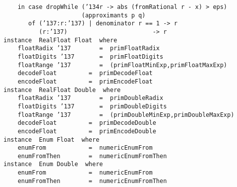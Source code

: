 \mbox{\tt \ \ \ \ in\ case\ dropWhile\ ({\char'134}r\ ->\ abs\ (fromRational\ r\ -\ x)\ >\ eps)}\\
\mbox{\tt \ \ \ \ \ \ \ \ \ \ \ \ \ \ \ \ \ \ \ \ \ \ (approximants\ p\ q)}\\
\mbox{\tt \ \ \ \ \ \ \ of\ ({\char'137}:r:{\char'137})\ |\ denominator\ r\ ==\ 1\ ->\ r}\\
\mbox{\tt \ \ \ \ \ \ \ \ \ \ (r:{\char'137})\ \ \ \ \ \ \ \ \ \ \ \ \ \ \ \ \ \ \ \ \ \ \ \ ->\ r}
\eprogB\noindent\bprogB
\mbox{\tt instance\ \ RealFloat\ Float\ \ where}\\
\mbox{\tt \ \ \ \ floatRadix\ {\char'137}\ \ \ \ \ \ \ \ =\ \ primFloatRadix}\\
\mbox{\tt \ \ \ \ floatDigits\ {\char'137}\ \ \ \ \ \ \ =\ \ primFloatDigits}\\
\mbox{\tt \ \ \ \ floatRange\ {\char'137}\ \ \ \ \ \ \ \ =\ \ (primFloatMinExp,primFloatMaxExp)}\\
\mbox{\tt \ \ \ \ decodeFloat\ \ \ \ \ \ \ \ \ =\ \ primDecodeFloat}\\
\mbox{\tt \ \ \ \ encodeFloat\ \ \ \ \ \ \ \ \ =\ \ primEncodeFloat}
%
\eprogB\noindent\bprogB
\mbox{\tt instance\ \ RealFloat\ Double\ \ where}\\
\mbox{\tt \ \ \ \ floatRadix\ {\char'137}\ \ \ \ \ \ \ \ =\ \ primDoubleRadix}\\
\mbox{\tt \ \ \ \ floatDigits\ {\char'137}\ \ \ \ \ \ \ =\ \ primDoubleDigits}\\
\mbox{\tt \ \ \ \ floatRange\ {\char'137}\ \ \ \ \ \ \ \ =\ \ (primDoubleMinExp,primDoubleMaxExp)}\\
\mbox{\tt \ \ \ \ decodeFloat\ \ \ \ \ \ \ \ \ =\ \ primDecodeDouble}\\
\mbox{\tt \ \ \ \ encodeFloat\ \ \ \ \ \ \ \ \ =\ \ primEncodeDouble}
%
\eprogB\noindent\bprogB
\mbox{\tt instance\ \ Enum\ Float\ \ where}\\
\mbox{\tt \ \ \ \ enumFrom\ \ \ \ \ \ \ \ \ \ \ \ =\ \ numericEnumFrom}\\
\mbox{\tt \ \ \ \ enumFromThen\ \ \ \ \ \ \ \ =\ \ numericEnumFromThen}
%
\eprogB\noindent\bprogB
\mbox{\tt instance\ \ Enum\ Double\ \ where}\\
\mbox{\tt \ \ \ \ enumFrom\ \ \ \ \ \ \ \ \ \ \ \ =\ \ numericEnumFrom}\\
\mbox{\tt \ \ \ \ enumFromThen\ \ \ \ \ \ \ \ =\ \ numericEnumFromThen}
%
\eprogB
